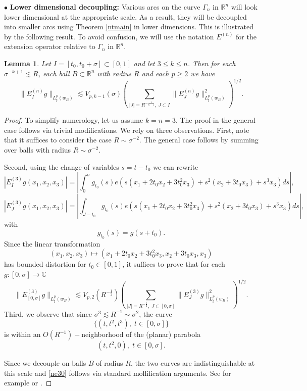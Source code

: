 \documentclass[amssymb,amsfonts,12pt]{amsart}
\newtheorem{lemma}[theorem]{Lemma}
\def\R{{\mathbb R}}
\def\C{{\mathbb C}}
\begin{document}
$\bullet$ \textbf{Lower dimensional decoupling:} Various arcs on the curve $\Gamma_n$ in $\R^n$ will look lower dimensional at the appropriate scale. As a result, they will be decoupled into smaller arcs using Theorem \ref{ntmain} in lower dimensions. This is illustrated by the following result. To avoid confusion, we will use the notation $E^{(n)}$ for the extension operator relative to $\Gamma_n$ in $\R^n$.
\begin{lemma}
\label{nl5}
Let $I=[t_0,t_0+\sigma]\subset [0,1]$ and let $3\le k\le n$.
Then for each $\sigma^{-k+1}\lesssim R$, each ball $B\subset\R^n$ with radius $R$ and each $p\ge 2$ we have
$$\|E_{I}^{(n)}g\|_{L^{p}_\sharp(w_B)}\lesssim V_{p,k-1}(\sigma)(\sum_{|J|=R^{-\frac1{k-1}},\;J\subset I}\|E_{J}^{(n)}g\|_{L^{p}_\sharp(w_B)}^2)^{1/2}.$$
\end{lemma}
\begin{proof}
To simplify numerology, let us assume $k=n=3$. The proof in the general case  follows via trivial modifications. We rely on three observations. First, note that it suffices to consider the case  $R\sim\sigma^{-2}$. The general case follows by summing over balls with radius $R\sim\sigma^{-2}$.



Second, using the change of variables $s=t-t_0$ we can rewrite
$$|E_{I}^{(3)}g(x_1,x_2,x_3)|=|\int_0^\sigma g_{t_0}(s)e(s(x_1+2t_0x_2+3t_0^2x_3)+s^2(x_2+3t_0x_3)+s^3x_3)ds|,$$
$$|E_{J}^{(3)}g(x_1,x_2,x_3)|=|\int_{J-t_0} g_{t_0}(s)e(s(x_1+2t_0x_2+3t_0^2x_3)+s^2(x_2+3t_0x_3)+s^3x_3)ds|,$$
with
$$g_{t_0}(s)=g(s+t_0).$$
Since the linear transformation
$$(x_1,x_2,x_3)\mapsto(x_1+2t_0x_2+3t_0^2x_3,x_2+3t_0x_3,x_3)$$
has bounded distortion for $t_0\in[0,1]$, it suffices to prove that for each $g:[0,\sigma]\to\C$
\begin{equation}
\label{ne30}
\|E_{[0,\sigma]}^{(3)}g\|_{L^{p}_\sharp(w_B)}\lesssim V_{p,2}(R^{-\frac1{2}})(\sum_{|J|=R^{-\frac1{2}},\;J\subset [0,\sigma]}\|E_{J}^{(3)}g\|_{L^{p}_\sharp(w_B)}^2)^{1/2}.
\end{equation}
Third, we observe that since $\sigma^{3}\lesssim R^{-1}\sim \sigma^2$, the curve
$$\{(t,t^2,t^3),\;t\in[0,\sigma]\}$$
is within an $O(R^{-1})-$neighborhood of the (planar) parabola
$$(t,t^2,0),\;t\in[0,\sigma].$$

Since we decouple on balls $B$ of radius $R$, the two curves are indistinguishable at this scale and \eqref{ne30} follows via standard mollification arguments. See for example \cite{BD3} or \cite{BD4}.

\end{proof}
\medskip
\end{document}
